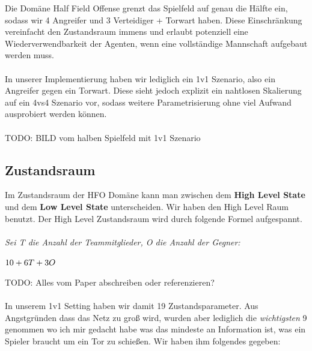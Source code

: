         Die Domäne Half Field Offense grenzt das Spielfeld auf genau die Hälfte ein, sodass wir 4 Angreifer und 3 Verteidiger + Torwart haben.
        Diese Einschränkung vereinfacht den Zustandsraum immens und erlaubt potenziell eine Wiederverwendbarkeit der Agenten, wenn eine vollständige Mannschaft aufgebaut werden muss.\\
        \\
        In unserer Implementierung haben wir lediglich ein 1v1 Szenario, also ein Angreifer gegen ein Torwart. Diese sieht jedoch explizit ein nahtlosen Skalierung auf ein 4vs4 Szenario vor, sodass weitere Parametrisierung ohne viel Aufwand ausprobiert werden können.\\
        \\
        TODO: BILD vom halben Spielfeld mit 1v1 Szenario \\

        \subsection{Zustandsraum}
            Im Zustandsraum der HFO Domäne kann man zwischen dem \textbf{High Level State} und dem \textbf{Low Level State} unterscheiden.
            Wir haben den High Level Raum benutzt. Der High Level Zustandsraum wird durch folgende Formel aufgespannt.\\
            \\
            \textit{Sei T die Anzahl der Teammitglieder, O die Anzahl der Gegner:}
            \begin{center}
                {$ 10 + 6T + 3O \hspace{10mm} $}
            \end{center}
            TODO: Alles vom Paper abschreiben oder referenzieren? \\
            \\
            In unserem 1v1 Setting haben wir damit 19 Zustandsparameter. Aus Angstgründen dass das Netz zu groß wird, wurden aber lediglich die \textit{wichtigsten} 9 genommen wo ich mir gedacht habe was das mindeste an Information ist, was ein Spieler braucht um ein Tor zu schießen. Wir haben ihm folgendes gegeben:

